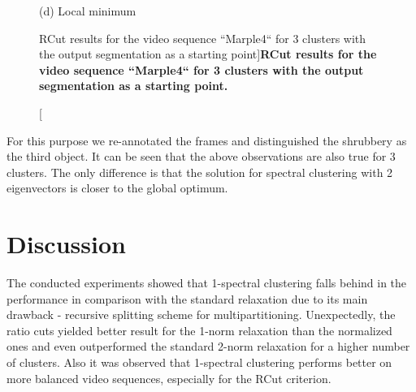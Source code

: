 \begin{figure}[htbp]
\begin{minipage}[t]{0.5\linewidth}
\begin{minipage}[t]{1\textwidth}
\centering
\hfill \hfill   \hfill 
{} 
\hfill 
{} 
\hfill 
{} 
\hfill 
{} 

\footnotesize (d) Local minimum
\end{minipage}

\end{minipage}
\caption[RCut results for the video sequence ``Marple4`` for 3 clusters with the output segmentation as a starting point]{
{\bf RCut results for the video sequence ``Marple4`` for 3 clusters with the output segmentation as a starting point.}}
\label{fig:RCut_3}
\end{figure}

For this purpose we re-annotated the frames and distinguished the shrubbery as the third object.
It can be seen that the above observations are also true for 3 clusters. The only difference is that the solution for spectral clustering with 2 eigenvectors 
is closer to the global optimum.
\section{Discussion}
\label{ch4:disc}
The conducted experiments showed that 1-spectral clustering falls behind in the performance in comparison with the standard relaxation due to its main drawback - recursive splitting scheme for multipartitioning.
Unexpectedly, the ratio cuts yielded better result for the 1-norm relaxation than the normalized ones and even outperformed the standard 2-norm relaxation for a higher number of clusters. Also it was observed that
1-spectral clustering performs better on more balanced video sequences, especially for the RCut criterion.

